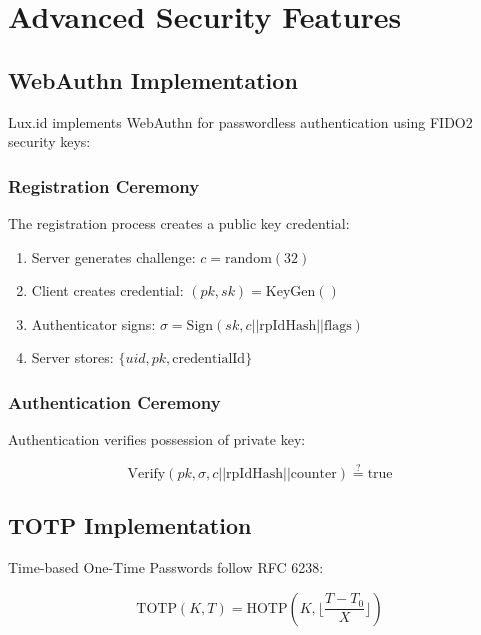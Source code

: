 \section{Advanced Security Features}


\subsection{WebAuthn Implementation}

Lux.id implements WebAuthn for passwordless authentication using FIDO2 security keys:

\subsubsection{Registration Ceremony}

The registration process creates a public key credential:

\begin{enumerate}
    \item Server generates challenge: $c = \text{random}(32)$
    \item Client creates credential: $(pk, sk) = \text{KeyGen}()$
    \item Authenticator signs: $\sigma = \text{Sign}(sk, c || \text{rpIdHash} || \text{flags})$
    \item Server stores: $\{uid, pk, \text{credentialId}\}$
\end{enumerate}

\subsubsection{Authentication Ceremony}

Authentication verifies possession of private key:

\begin{equation}
    \text{Verify}(pk, \sigma, c || \text{rpIdHash} || \text{counter}) \stackrel{?}{=} \text{true}
\end{equation}

\subsection{TOTP Implementation}

Time-based One-Time Passwords follow RFC 6238:

\begin{equation}
    \text{TOTP}(K, T) = \text{HOTP}(K, \lfloor \frac{T - T_0}{X} \rfloor)
\end{equation}

